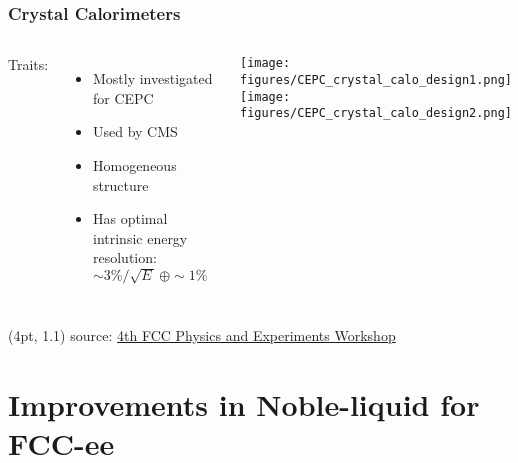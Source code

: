 \documentclass[aspectratio=169]{beamer}
\newcommand{\bluetext}[1]{%
  \textcolor{myBlue}{#1}
}
\begin{document}
\begin{frame}
  \frametitle{Crystal Calorimeters}

  \begin{columns}[c]
    \bluetext{Traits:}
    \begin{itemize}
      \item Mostly investigated for CEPC
      \item Used by CMS
      \item Homogeneous structure
      \item Has optimal intrinsic energy resolution:
            $\sim 3\%/\sqrt{E\,} \, \oplus \sim 1\%$
    \end{itemize}

    \begin{center}
      \texttt{[image: figures/CEPC\_crystal\_calo\_design1.png]}%
      \vspace{2ex}
      \texttt{[image: figures/CEPC\_crystal\_calo\_design2.png]}
    \end{center}
  \end{columns}

  \begin{textblock*}{\paperwidth}(4pt, 1.1\textheight)
    \tiny source:
    \href{https://indico.cern.ch/event/932973/}
         {4th FCC Physics and Experiments Workshop}
  \end{textblock*}
\end{frame}


%
%
\section{Improvements in Noble-liquid for FCC-ee}
\end{document}
